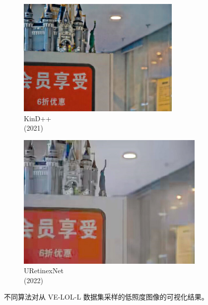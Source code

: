 \documentclass[a4paper]{ctexart}
\begin{document}
\begin{figure}[htbp]
\begin{subfigure}{0.17\columnwidth}
			\includegraphics[width=\linewidth]{picture/LLIE/VE-LOL-L/KinD++}
			\captionsetup{font=scriptsize}
			\caption*{KinD++ \\ (2021)}
			\label{fig: KinD++}	
		\end{subfigure}
		\begin{subfigure}{0.17\columnwidth}
			\includegraphics[width=\linewidth]{picture/LLIE/VE-LOL-L/URetinexNet}
			\captionsetup{font=scriptsize}
			\caption*{URetinexNet \\ (2022)}
			\label{fig: URetinexNet}	
		\end{subfigure}
		\caption{
			\label{fig: VE-LOL-L Visual} 
			不同算法对从 VE-LOL-L 数据集采样的低照度图像的可视化结果。 
		}
	\end{figure}
	
\end{document}
